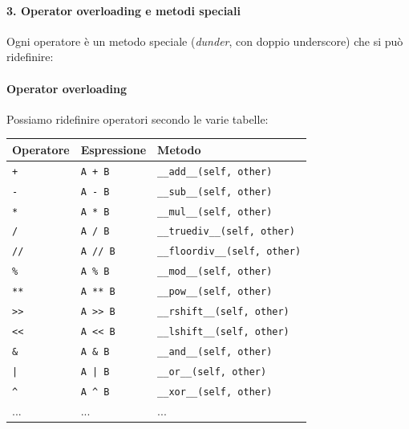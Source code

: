 \documentclass[12pt]{extarticle}
\begin{document}
\paragraph{3. Operator overloading e metodi speciali} Ogni operatore è un metodo speciale (\emph{dunder}, con doppio underscore) che si può ridefinire:
\paragraph{Operator overloading} Possiamo ridefinire operatori secondo le varie tabelle:
\begin{center}
\small
\begin{tabular}{p{2.0cm}p{3.0cm}p{5.6cm}}
    \toprule
    \textbf{Operatore} & \textbf{Espressione} & \textbf{Metodo} \\
    \midrule
    \texttt{+} & \texttt{A + B} & \texttt{\_\_add\_\_(self, other)} \\
    \addlinespace
    \texttt{-} & \texttt{A - B} & \texttt{\_\_sub\_\_(self, other)} \\
    \addlinespace
    \texttt{*} & \texttt{A * B} & \texttt{\_\_mul\_\_(self, other)} \\
    \addlinespace
    \texttt{/} & \texttt{A / B} & \texttt{\_\_truediv\_\_(self, other)} \\
    \addlinespace
    \texttt{//} & \texttt{A // B} & \texttt{\_\_floordiv\_\_(self, other)} \\
    \addlinespace
    \texttt{\%} & \texttt{A \% B} & \texttt{\_\_mod\_\_(self, other)} \\
    \addlinespace
    \texttt{**} & \texttt{A ** B} & \texttt{\_\_pow\_\_(self, other)} \\
    \addlinespace
    \texttt{>>} & \texttt{A >> B} & \texttt{\_\_rshift\_\_(self, other)} \\
    \addlinespace
    \texttt{<<} & \texttt{A << B} & \texttt{\_\_lshift\_\_(self, other)} \\
    \addlinespace
    \texttt{\&} & \texttt{A \& B} & \texttt{\_\_and\_\_(self, other)} \\
    \addlinespace
    \texttt{|} & \texttt{A | B} & \texttt{\_\_or\_\_(self, other)} \\
    \addlinespace
    \texttt{\^{}} & \texttt{A \^{} B} & \texttt{\_\_xor\_\_(self, other)} \\
    \addlinespace
    ... & ... & ... \\
    \bottomrule
\end{tabular}
\end{center}
\end{document}
